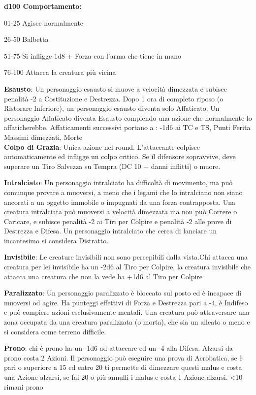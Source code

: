 \documentclass[a4paper,12 pt,openany]{book}
\begin{document}
\begin{textblock*}{19 cm}
\begin{multicols}{2}
\textbf{d100 Comportamento:}

01-25 Agisce normalmente

26-50 Balbetta

51-75 Si infligge 1d8 + Forza con l'arma che tiene in mano

76-100 Attacca la creatura più vicina

\textbf{Esausto}: Un personaggio esausto si muove a velocità dimezzata e subisce penalità -2 a Costituzione e Destrezza. Dopo 1 ora di completo riposo (o Ristorare Inferiore), un personaggio esausto diventa solo Affaticato. Un personaggio Affaticato diventa Esausto compiendo una azione che normalmente lo affaticherebbe.
Affaticamenti successivi portano a : -1d6 ai TC e TS, Punti Ferita Massimi dimezzati, Morte\\

\textbf{Colpo di Grazia}: Unica azione nel round. L'attaccante colpisce automaticamente ed infligge un colpo critico. Se il difensore sopravvive, deve superare un Tiro Salvezza su Tempra (DC 10 + danni inflitti) o muore.

\textbf{Intralciato}: Un personaggio intralciato ha difficoltà di movimento, ma può comunque provare a muoversi, a meno che i legami che lo intralciano non siano ancorati a un oggetto immobile o impugnati da una forza contrapposta.
Una creatura intralciata può muoversi a velocità dimezzata ma non può Correre o Caricare, e subisce penalità -2 ai Tiri per Colpire e penalità -2 alle prove di Destrezza e Difesa.
Un personaggio intralciato che cerca di lanciare un incantesimo si considera Distratto.

\textbf{Invisibile}: Le creature invisibili non sono percepibili dalla vista.Chi attacca una creatura per lei invisibile ha un -2d6 al Tiro per Colpire, la creatura invisibile che attacca una creatura che non la vede ha +1d6 al Tiro per Colpire

\textbf{Paralizzato}: Un personaggio paralizzato è bloccato sul posto ed è incapace di muoversi od agire. Ha punteggi effettivi di Forza e Destrezza pari a -4, è Indifeso e può compiere azioni esclusivamente mentali.
Una creatura può attraversare una zona occupata da una creatura paralizzata (o morta), che sia un alleato o meno e si considera come terreno difficile.

\textbf{Prono}: chi è prono ha un -1d6 ad attaccare ed un -4 alla Difesa. Alzarsi da prono costa 2 Azioni.
Il personaggio può eseguire una prova di Acrobatica, se è pari o superiore a 15 ed entro 20 ti permette di dimezzare questi malus e costa una Azione alzarsi, se fai 20 o più annulli i malus e costa 1 Azione alzarsi. <10 rimani prono


\end{multicols}
\end{textblock*}
\end{document}

